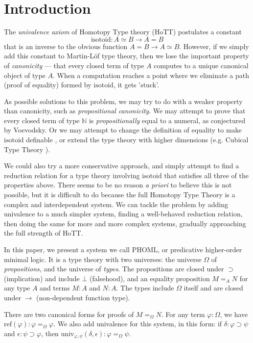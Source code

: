 \documentclass[a4paper,UKenglish]{lipics-v2016}
\newcommand*{\isotoid}{\ensuremath{\mathrm{isotoid}}}
\newcommand*{\reff}[1]{\ensuremath{\mathrm{ref} \left( {#1} \right)}}
\newcommand*{\univ}[4]{\ensuremath{\mathrm{univ}_{{#1}, {#2}} \left({#3} , {#4} \right)}}
\theoremstyle{plain}
\theoremstyle{definition}
\begin{document}
\section{Introduction}


The \emph{univalence axiom} of Homotopy Type theory (HoTT) \cite{hottbook} postulates a
constant
$$ \isotoid : A \simeq B \rightarrow A = B $$
that is an inverse to the obvious function $A = B \rightarrow A \simeq B$.  However, if we simply add this constant to Martin-L\"{o}f type theory, then
we lose the important property of \emph{canonicity} --- that every closed term of type $A$ computes to a unique canonical object of type $A$.  When a computation reaches a point
where we eliminate a path (proof of equality) formed by $\isotoid$, it gets 'stuck'.

As possible solutions to this problem, we may try to do with a weaker property than canonicity, such as \emph{propositional canonicity}.
We may attempt to prove that every closed term of type $\mathbb{N}$ is \emph{propositionally} equal to a numeral, as conjectured by Voevodsky.  Or we may attempt to change the definition of equality to make $\isotoid$ definable \cite{Polonsky14a}, or extend the type theory with higher dimensions (e.g. Cubical Type Theory \cite{cchm:cubical}).

We could also try a more conservative approach, and simply attempt to find a reduction relation for a type theory involving $\isotoid$ that satisfies
all three of the properties above.  There seems to be no reason \emph{a priori} to believe this is not possible, but it is difficult to do because
the full Homotopy Type Theory is a complex and interdependent system.  We can tackle the problem by adding univalence to a much simpler system, finding
a well-behaved reduction relation, then doing the same for more and more complex systems, gradually approaching the full strength of HoTT.

In this paper, we present a system we call PHOML, or predicative higher-order minimal logic.  It is a type theory with two universes: the universe $\Omega$
of \emph{propositions}, and the universe of \emph{types}.  The propositions are closed under $\supset$ (implication) and include $\bot$ (falsehood), and an equality proposition $M =_A N$ for
any type $A$ and terms $M : A$ and $N : A$.  The types include $\Omega$ itself and are closed under $\rightarrow$ (non-dependent function type).

There are two canonical forms for proofs of $M =_\Omega N$.  For any term $\varphi : \Omega$, we have $\reff{\varphi} : \varphi =_\Omega \varphi$.  We also add univalence for this system, in this form:
if $\delta : \varphi \supset \psi$ and $\epsilon : \psi \supset\varphi$, then $\univ{\varphi}{\psi}{\delta}{\epsilon} : \varphi =_\Omega \psi$.  
\end{document}
